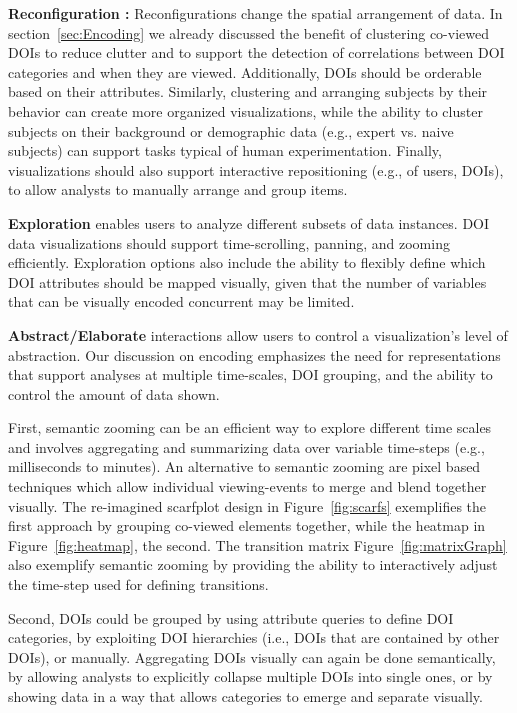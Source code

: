\noindent \textbf{Reconfiguration :}
Reconfigurations change the spatial arrangement of data.  In section~\ref{sec:Encoding} we already discussed the benefit of clustering co-viewed DOIs to reduce clutter and to support the detection of correlations between DOI categories and when they are viewed. Additionally, DOIs should be orderable based on their attributes. Similarly, clustering and arranging subjects by their behavior can create more organized visualizations, while the ability to cluster subjects on their background or demographic data (e.g., expert vs. naive subjects) can support tasks typical of human experimentation. Finally, visualizations should also support interactive repositioning (e.g., of users, DOIs), to allow analysts to manually arrange and group items.


\noindent \textbf{Exploration} enables users to analyze different subsets of data instances. DOI data visualizations should support time-scrolling, panning, and zooming efficiently. Exploration options also include the ability to flexibly define which DOI attributes should be mapped visually, given that the number of variables that can be visually encoded concurrent may be limited. 
	
\noindent \textbf{Abstract/Elaborate} interactions allow users to control a visualization's level of abstraction. Our discussion on encoding emphasizes the need for representations that support analyses at multiple time-scales, DOI grouping, and the ability to control the amount of data shown. 

First, semantic zooming can be an efficient way to explore different time scales and involves aggregating and summarizing data over variable time-steps (e.g., milliseconds to minutes). An alternative to semantic zooming are pixel based techniques which allow individual viewing-events to merge and blend together visually\cite{keim2000designing}. The re-imagined scarfplot design in Figure~\ref{fig:scarfs} exemplifies the first approach by grouping co-viewed elements together, while the heatmap in Figure~\ref{fig:heatmap}, the second. The transition matrix Figure~\ref{fig:matrixGraph} also exemplify semantic zooming by providing the ability to interactively adjust the time-step used for defining transitions.  

Second, DOIs could be grouped by using attribute queries to define DOI categories, by exploiting DOI hierarchies (i.e., DOIs that are contained by other DOIs), or manually. Aggregating DOIs visually can again be done semantically, by allowing analysts to explicitly collapse multiple DOIs into single ones, or by showing data in a way that allows categories to emerge and separate visually. 

